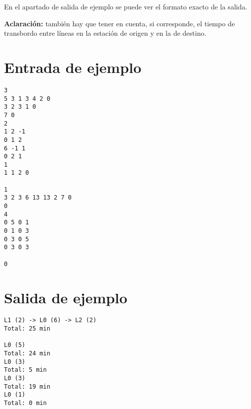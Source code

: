 \documentclass[a4paper]{article}
\begin{document}
En el apartado de salida de ejemplo se puede ver el formato exacto de la salida.

\medskip

\textbf{Aclaración:} también hay que tener en cuenta, si corresponde, el tiempo de transbordo entre líneas en la estación de origen y en la de destino.

\section*{Entrada de ejemplo}

\begin{verbatim}
3
5 3 1 3 4 2 0
3 2 3 1 0
7 0
2
1 2 -1
0 1 2
6 -1 1
0 2 1
1
1 1 2 0

1
3 2 3 6 13 13 2 7 0
0
4
0 5 0 1
0 1 0 3
0 3 0 5
0 3 0 3

0
\end{verbatim}

\section*{Salida de ejemplo}

\begin{verbatim}
L1 (2) -> L0 (6) -> L2 (2)
Total: 25 min

L0 (5)
Total: 24 min
L0 (3)
Total: 5 min
L0 (3)
Total: 19 min
L0 (1)
Total: 0 min
\end{verbatim}
\end{document}
